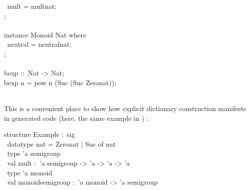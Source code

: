 \begin{isabellebody}
\begin{isamarkuptext}
\hspace*{0pt} ~mult = mult{}nat;\\
\hspace*{0pt}{\char125};\\
\hspace*{0pt}\\
\hspace*{0pt}instance Monoid Nat where {}\\
\hspace*{0pt} ~neutral = neutral{}nat;\\
\hspace*{0pt}{\char125};\\
\hspace*{0pt}\\
\hspace*{0pt}bexp ::~Nat -> Nat;\\
\hspace*{0pt}bexp n = pow n (Suc (Suc Zero{}nat));\\
\hspace*{0pt}\\
\hspace*{0pt}{\char125}%
\end{isamarkuptext}%
\isamarkuptrue%
%
\endisatagquote
{\isafoldquote}%
%
\isadelimquote
%
\endisadelimquote
%
\begin{isamarkuptext}%
\noindent This is a convenient place to show how explicit dictionary construction
  manifests in generated code (here, the same example in )
  \cite{Haftmann-Nipkow:2010:code}:%
\end{isamarkuptext}%
\isamarkuptrue%
%
\isadelimquote
%
\endisadelimquote
%
\isatagquote
%
\begin{isamarkuptext}%
\isatypewriter%
\noindent%
\hspace*{0pt}structure Example :~sig\\
\hspace*{0pt} ~datatype nat = Zero{}nat | Suc of nat\\
\hspace*{0pt} ~type 'a semigroup\\
\hspace*{0pt} ~val mult :~'a semigroup -> 'a -> 'a -> 'a\\
\hspace*{0pt} ~type 'a monoid\\
\hspace*{0pt} ~val monoid{}semigroup :~'a monoid -> 'a semigroup\\

\end{isamarkuptext}
\end{isabellebody}
